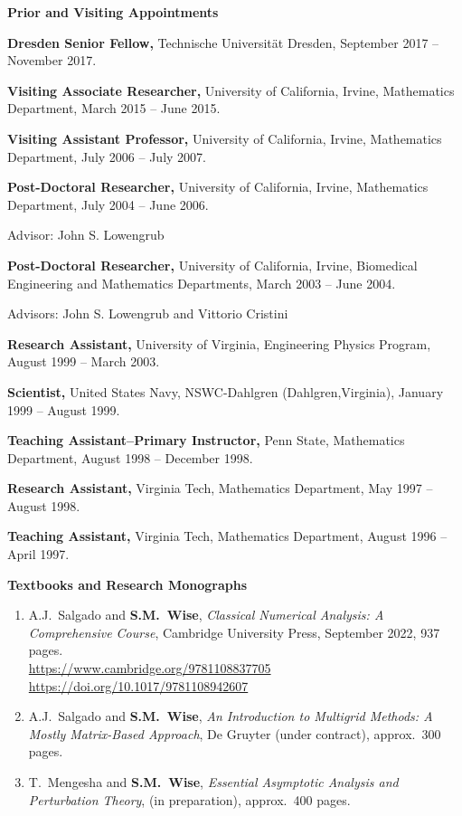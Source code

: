 \documentclass[11pt]{letter}
\begin{document}
{\LARGE\bf  Prior and Visiting Appointments}
    \begin{description}    \item 
\textbf{Dresden Senior Fellow,} Technische Universit\"{a}t Dresden, September 2017 -- November 2017.
    \item 
\textbf{Visiting Associate Researcher,} University of California, Irvine,
Mathematics Department, March 2015 -- June 2015. 
    \item 
\textbf{Visiting Assistant Professor,} University of California, Irvine,
Mathematics Department, July 2006 -- July 2007.
    \item 
\textbf{Post-Doctoral Researcher,} University of California, Irvine, Mathematics Department, July 2004 -- June 2006.
    \begin{description}
    \item
Advisor: John S. Lowengrub
    \end{description}
    	\item 
\textbf{Post-Doctoral Researcher,} University of California, Irvine, Biomedical Engineering and Mathematics Departments, March 2003 -- June 2004.
    \begin{description}
    \item
Advisors: John S. Lowengrub and Vittorio Cristini
    \end{description}
	\item
\textbf{Research Assistant,} University of Virginia, Engineering Physics Program, August 1999 -- March 2003.
    \item
\textbf{Scientist,} United States Navy, NSWC-Dahlgren (Dahlgren,Virginia), January 1999 -- August 1999.
    \item
\textbf{Teaching Assistant--Primary Instructor,} Penn State, Mathematics Department, August 1998 -- December 1998.
    \item
\textbf{Research Assistant,} Virginia Tech, Mathematics Department, May 1997 -- August 1998.
    \item
\textbf{Teaching Assistant,} Virginia Tech, Mathematics Department, August 1996 -- April 1997.
    \end{description}


{\LARGE\bf  Textbooks and Research Monographs}
    \begin{enumerate}
    \item
A.J.~Salgado and \textbf{S.M.~Wise}, {\sl Classical Numerical Analysis: A Comprehensive Course}, Cambridge University Press, September 2022, 937 pages.
	\\
\url{https://www.cambridge.org/9781108837705}
	\\
\url{https://doi.org/10.1017/9781108942607}
    \item
A.J.~Salgado and \textbf{S.M.~Wise}, {\sl An Introduction to Multigrid Methods: A Mostly Matrix-Based Approach}, De Gruyter (under contract), approx.~300 pages.
	\item
T.~Mengesha and \textbf{S.M.~Wise}, {\sl Essential Asymptotic Analysis and Perturbation Theory},  (in preparation), approx.~400 pages.
    \end{enumerate}
\end{document}
